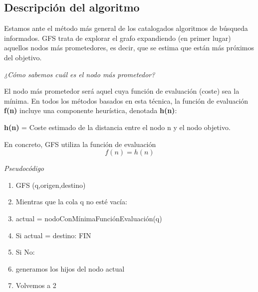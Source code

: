 \documentclass[conference]{IEEEtran}
\begin{document}
{\vspace{0.2mm}

\subsection{Descripción del algoritmo}

Estamos ante el método más general de los catalogados algoritmos de búsqueda informados. GFS trata de explorar el grafo expandiendo (en primer lugar) aquellos nodos más prometedores, es decir, que se estima que están más próximos del objetivo.\\


\begin{center}\textit{¿Cómo sabemos cuál es el nodo más prometedor?}\end{center}

\vspace{0.1mm}

El nodo más prometedor será aquel cuya función de evaluación (coste) sea la mínima. En todos los métodos basados en esta técnica, la función de evaluación \textbf{f(n)} incluye una componente heurística, denotada \textbf{h(n)}: 
 \begin{center}
 \textbf{h(n)} = Coste estimado de la distancia entre el nodo n y el nodo objetivo.
 \end{center}

En concreto, GFS utiliza la función de evaluación \[f(n) = h(n)\]

\begin{center}\textit{Pseudocódigo}\end{center}

\begin{enumerate}
\item GFS (q,origen,destino)
\item Mientras que la cola q no esté vacía:
\item \hspace{1cm} actual = nodoConMínimaFunciónEvaluación(q)
\item \hspace{1cm} Si actual = destino: FIN
\item \hspace{1cm} Si No:
\item \hspace{1.25cm} generamos los hijos del nodo actual
\item \hspace{1.25cm} Volvemos a 2
\end{enumerate}

}
\end{document}
